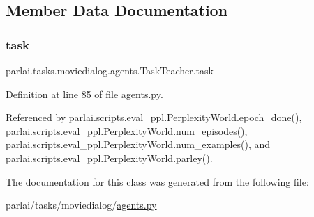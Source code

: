 \subsection{Member Data Documentation}
\mbox{\label{classparlai_1_1tasks_1_1moviedialog_1_1agents_1_1TaskTeacher_a415ac0cd746556273a07ea8967ed30db}} 
\subsubsection{\texorpdfstring{task}{task}}
{\footnotesize\ttfamily parlai.\+tasks.\+moviedialog.\+agents.\+Task\+Teacher.\+task}



Definition at line 85 of file agents.\+py.



Referenced by parlai.\+scripts.\+eval\+\_\+ppl.\+Perplexity\+World.\+epoch\+\_\+done(), parlai.\+scripts.\+eval\+\_\+ppl.\+Perplexity\+World.\+num\+\_\+episodes(), parlai.\+scripts.\+eval\+\_\+ppl.\+Perplexity\+World.\+num\+\_\+examples(), and parlai.\+scripts.\+eval\+\_\+ppl.\+Perplexity\+World.\+parley().



The documentation for this class was generated from the following file\+:\begin{DoxyCompactItemize}
\item 
parlai/tasks/moviedialog/\hyperlink{parlai_2tasks_2moviedialog_2agents_8py}{agents.\+py}\end{DoxyCompactItemize}
